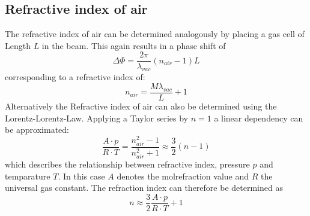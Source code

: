 \subsection{Refractive index of air}
The refractive index of air can be determined analogously by placing a gas cell of Length $L$ in the beam. This again results in a phase shift of
\begin{equation*}
\Delta \Phi=\frac{2\pi}{\lambda_{vac}}(n_{air}-1)L
\end{equation*}
corresponding to a refractive index of:
\begin{equation}
    n_{air}=\frac{M\lambda_{vac}}{L}+1
    \label{eq:n_air}
\end{equation}
Alternatively the Refractive index of air can also be determined using the Lorentz-Lorentz-Law. Applying a Taylor series by $n = 1$ a linear dependency can be approximated:
\begin{equation}
    \frac{A \cdot p}{R \cdot T} = \frac{n_{air}^2-1}{n_{air}^2+1} \approx \frac{3}{2} (n - 1)
\end{equation}
which describes the relationship between refractive index, pressure $p$ and temparature $T$. In this case $A$ denotes the molrefraction value and $R$ the universal gas constant.
The refraction index can therefore be determined as
\begin{equation}
    n \approx \frac{3}{2} \frac{A \cdot p}{R \cdot T} + 1
    \label{eq:n_glas_taylor}
\end{equation}